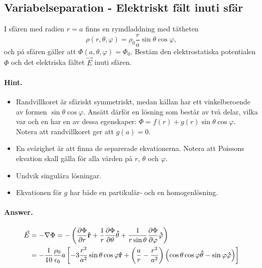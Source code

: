 \documentclass[%
oneside,                 %
final,                   %
10pt]{article}
\newenvironment{doconceexercise}{}{}
\newcounter{doconceexercisecounter}
\begin{document}
\begin{doconceexercise}

\subsection*{Variabelseparation - Elektriskt fält inuti sfär}

I sfären med radien $r = a$ finns en 
rymdladdning med tätheten 
\begin{equation}
  \rho\left(r, \theta, \varphi\right) = \rho_0 \frac{r}{a} \sin \theta \cos
\varphi,
\end{equation}
och på sfären gäller att $\Phi\left(a,\theta,\varphi\right) = \Phi_0$.
Bestäm den elektrostatiska potentialen $\Phi$ och det elektriska fältet
$\vec{E}$ inuti sfären.


\paragraph{Hint.}
\begin{itemize}
\item Randvillkoret är sfäriskt symmetriskt, medan källan har ett vinkelberoende av formen $\sin \theta \cos \varphi$. Ansätt därför en lösning som består av två delar, vilka var och en har en av dessa egenskaper: $\Phi = f\left(r\right) + g\left(r\right) \sin \theta \cos \varphi$. Notera att randvillkoret ger att $g(a) = 0$.

\item En svårighet är att finna de separerade ekvationerna. Notera att Poissons ekvation skall gälla för alla värden på $r$, $\theta$ och $\varphi$. 

\item Undvik singulära lösningar.

\item Ekvationen för $g$ har både en partikulär- och en homogenlösning.
\end{itemize}

\noindent


\paragraph{Answer.}
\begin{align}
  \vec{E} &= - \nabla \Phi = - \left(\frac{\partial \Phi}{\partial r} 
{\bf \hat r} + \frac{1}{r} \frac{\partial \Phi}{\partial \theta} 
{\bf \hat \theta} + \frac{1}{r \sin \theta} 
\frac{\partial \Phi}{\partial \varphi} {\bf \hat \varphi}\right)
\nonumber \\
&= - \frac{1}{10}\frac{\rho_0}{\epsilon_0} a \left[-3 \frac{r^2}{a^2} \sin \theta
\cos \varphi {\bf \hat r} + \left(\frac{a}{r} - \frac{r^2}{a^2}\right) \left(
\cos \theta \cos \varphi {\bf \hat \theta} - \sin \varphi {\bf \hat \varphi}
\right) \right]
\end{align}


\end{doconceexercise}
\end{document}
